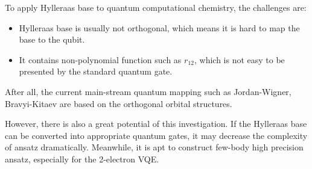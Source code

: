To apply Hylleraas base to quantum computational chemistry, the challenges are:
\begin{itemize}
    \item Hylleraas base is usually not orthogonal, which means it is hard to map the base to the qubit.
    \item It contains non-polynomial function such as $r_{12}$, which is not easy to be presented by the standard quantum gate.
\end{itemize}
After all, the current main-stream quantum mapping such as Jordan-Wigner, Bravyi-Kitaev are based on the orthogonal orbital structures.

However, there is also a great potential of this investigation. If the Hylleraas base can be converted into appropriate quantum gates, it may decrease the complexity of ansatz dramatically. Meanwhile, it is apt to construct few-body high precision ansatz, especially for the 2-electron VQE.

